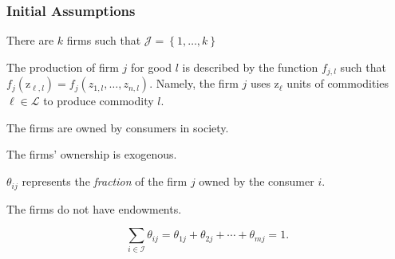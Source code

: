 \documentclass[8pt,a4paper]{extarticle}
\begin{document}
\begin{multicols}{3}
  \subsubsection*{Initial Assumptions}

  \begin{bulletlist}
    \item There are $k$ firms such that $\mathcal{J} = \left\{ 1, \dots, k \right\}$
    \item The production of firm $j$ for good $l$ is described by the function $f_{j,l}$ such that $f_{j} (\mathrm{z}_{\ell,l}) = f_{j} (z_{1,l}, \dots, z_{n,l})$. Namely, the firm $j$ uses $\mathrm{z}_{\ell}$ units of commodities $\ell \in \mathcal{L}$ to produce commodity $l$.
    \item The firms are owned by consumers in society.
    \item The firms' ownership is exogenous.
    \item $\theta_{ij}$ represents the \emph{fraction} of the firm $j$ owned by the consumer $i$.
    \item The firms do not have endowments.
  \end{bulletlist}

  \begin{boxrmk}
    \[\sum_{i \in \mathcal{I}} \theta_{ij} = \theta_{1j} + \theta_{2j} + \cdots + \theta_{mj} = 1.\]
  \end{boxrmk}


\end{multicols}
\end{document}
